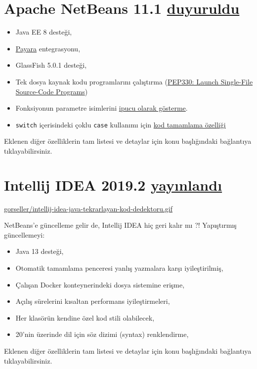 \documentclass[11pt]{article}
\begin{document}
\section{Apache NetBeans 11.1 \href{https://netbeans.apache.org/download/nb111/index.html}{duyuruldu}}
\label{sec:org06e9016}
\begin{itemize}
\item Java EE 8 desteği,
\item \href{https://www.payara.fish/}{Payara} entegrasyonu,
\item GlassFish 5.0.1 desteği,
\item Tek dosya kaynak kodu programlarını çalıştırma (\href{https://openjdk.java.net/jeps/330}{PEP330: Launch Single-File
Source-Code Programs})
\item Fonksiyonun parametre isimlerini \href{https://github.com/apache/netbeans/pull/1247}{ipucu olarak gösterme}.
\item \texttt{switch} içerisindeki çoklu \texttt{case} kullanımı için \href{https://github.com/apache/netbeans/pull/1175}{kod tamamlama özelliği}
\end{itemize}

Eklenen diğer özelliklerin tam listesi ve detaylar için konu başlığındaki
bağlantıya tıklayabilirsiniz.
\section{Intellij IDEA 2019.2 \href{https://www.jetbrains.com/idea/whatsnew/\#v2019-2}{yayınlandı}}
\label{sec:org545fca5}
\url{gorseller/intellij-idea-java-tekrarlayan-kod-dedektoru.gif}

NetBeans'e güncelleme gelir de, Intellij IDEA hiç geri kalır mı ?! Yapıştırmış
güncellemeyi:
\begin{itemize}
\item Java 13 desteği,
\item Otomatik tamamlama penceresi yanlış yazmalara karşı iyileştirilmiş,
\item Çalışan Docker konteynerindeki dosya sistemine erişme,
\item Açılış sürelerini kısaltan performans iyileştirmeleri,
\item Her klasörün kendine özel kod stili olabilecek,
\item 20'nin üzerinde dil için söz dizimi (syntax) renklendirme,
\end{itemize}

Eklenen diğer özelliklerin tam listesi ve detaylar için konu başlığındaki
bağlantıya tıklayabilirsiniz.
\end{document}

